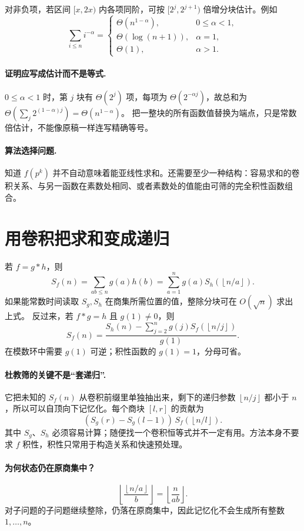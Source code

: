 \documentclass[UTF8,a4paper,11pt,oneside,openany,fontset=fandol]{ctexbook}
\theoremstyle{definition}
\newcommand{\floor}[1]{\left\lfloor #1\right\rfloor}
\begin{document}
对非负项，若区间 $[x,2x)$ 内各项同阶，可按 $[2^j,2^{j+1})$ 倍增分块估计。例如
\[
 \sum_{i\le n}i^{-\alpha}=
 \begin{cases}
 \Theta(n^{1-\alpha}),&0\le\alpha<1,\\
 \Theta(\log(n+1)),&\alpha=1,\\
 \Theta(1),&\alpha>1.
 \end{cases}
\]

\paragraph{证明应写成估计而不是等式.}
$0\le\alpha<1$ 时，第 $j$ 块有 $\Theta(2^j)$ 项，每项为 $\Theta(2^{-\alpha j})$，故总和为 $\Theta(\sum_j2^{(1-\alpha)j})=\Theta(n^{1-\alpha})$。
把一整块的所有函数值替换为端点，只是常数倍估计，不能像原稿一样连写精确等号。
\paragraph{算法选择问题.} 知道 $f(p^k)$ 并不自动意味着能亚线性求和。还需要至少一种结构：容易求和的卷积关系、与另一函数在素数处相同、或者素数处的值能由可筛的完全积性函数组合。


\section{用卷积把求和变成递归}
若 $f=g*h$，则
\[
S_f(n)=\sum_{ab\le n}g(a)h(b)
=\sum_{a=1}^n g(a)S_h(\floor{n/a}).
\]
如果能常数时间读取 $S_g,S_h$ 在商集所需位置的值，整除分块可在 $O(\sqrt n)$ 求出上式。
反过来，若 $f*g=h$ 且 $g(1)\ne0$，则
\[
\boxed{S_f(n)=\frac{S_h(n)-\sum_{j=2}^n g(j)S_f(\floor{n/j})}{g(1)}}.
\]
在模数环中需要 $g(1)$ 可逆；积性函数的 $g(1)=1$，分母可省。


\paragraph{杜教筛的关键不是“套递归”.}
它把未知的 $S_f(n)$ 从卷积前缀里单独抽出来，剩下的递归参数 $\floor{n/j}$ 都小于 $n$，所以可以自顶向下记忆化。每个商块 $[l,r]$ 的贡献为
\[
 (S_g(r)-S_g(l-1))\,S_f(\floor{n/l}).
\]
其中 $S_g$、$S_h$ 必须容易计算；随便找一个卷积恒等式并不一定有用。方法本身不要求 $f$ 积性，积性只常用于构造关系和快速预处理。

\paragraph{为何状态仍在原商集中？}
\[
\floor{\frac{\floor{n/a}}b}=\floor{\frac n{ab}}.
\]
对子问题的子问题继续整除，仍落在原商集中，因此记忆化不会生成所有整数 $1,\ldots,n$。
\end{document}
